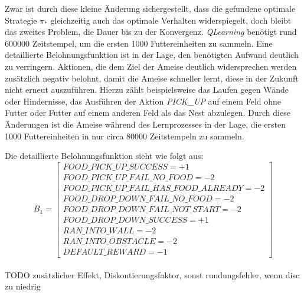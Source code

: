 Zwar ist durch diese kleine Änderung sichergestellt, dass die gefundene optimale Strategie $\pi_*$ gleichzeitig auch das optimale Verhalten widerspiegelt, doch bleibt das zweites Problem, die Dauer bis zu der Konvergenz. \textit{QLearning} benötigt rund $600000$ Zeitstempel, um die ersten 1000 Futtereinheiten zu sammeln. Eine detaillierte Belohnungsfunktion ist in der Lage, den benötigten Aufwand deutlich zu verringern. Aktionen, die dem Ziel der Ameise deutlich widersprechen werden zusätzlich negativ belohnt, damit die Ameise schneller lernt, diese in der Zukunft nicht erneut auszuführen. Hierzu zählt beispielsweise das Laufen gegen Wände oder Hindernisse, das Ausführen der Aktion \textit{PICK\_UP} auf einem Feld ohne Futter oder Futter auf einem anderen Feld als das Nest abzulegen. Durch diese Änderungen ist die Ameise während des Lernprozesses in der Lage, die ersten 1000 Futtereinheiten in nur circa $80000$ Zeitstempeln zu sammeln. 
\par
Die detaillierte Belohnungsfunktion sieht wie folgt aus:
\begin{equation}
    B_{1} =  \begin{bmatrix} 
        FOOD\_PICK\_UP\_SUCCESS = +1\\
        FOOD\_PICK\_UP\_FAIL\_NO\_FOOD = -2 \\
        FOOD\_PICK\_UP\_FAIL\_HAS\_FOOD\_ALREADY = -2\\
        FOOD\_DROP\_DOWN\_FAIL\_NO\_FOOD = -2 \\
        FOOD\_DROP\_DOWN\_FAIL\_NOT\_START = -2 \\
        FOOD\_DROP\_DOWN\_SUCCESS = +1\\
        RAN\_INTO\_WALL = -2\\
        RAN\_INTO\_OBSTACLE = -2 \\
        DEFAULT\_REWARD = -1                  
 \end{bmatrix}
\end{equation}
\\ TODO zusätzlicher Effekt, Diskontierungsfaktor, sonst rundungsfehler, wenn disc zu niedrig